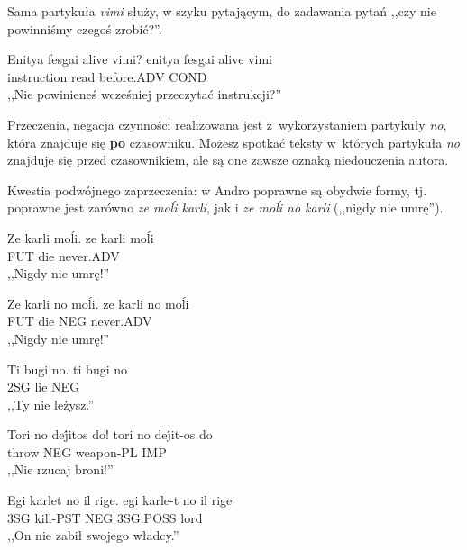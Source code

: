 \begin{spacing}{1.1}
Sama partykuła \emph{vimi} służy, w szyku pytającym, do zadawania pytań ,,czy
nie powinniśmy czegoś zrobić?''.

\begin{exe}
	\ex
	\trans Enitya fesgai alive vimi?
	\gll enitya fesgai alive vimi\\
	  instruction read before.ADV COND\\
	\glt  ,,Nie powinieneś wcześniej przeczytać instrukcji?''
\end{exe}

Przeczenia, negacja czynności realizowana jest z~wykorzystaniem partykuły
\emph{no}, która znajduje się \textbf{po} czasowniku. Możesz spotkać teksty
w~których partykuła \emph{no} znajduje się przed czasownikiem, ale są one zawsze
oznaką niedouczenia autora.

Kwestia podwójnego zaprzeczenia: w Andro poprawne są obydwie formy, tj. poprawne
jest zarówno \emph{ze moĺi karli}, jak i \emph{ze moĺi no karli} (,,nigdy nie
umrę'').

\begin{exe}
	\ex
	\trans Ze karli moĺi.
	\gll ze karli moĺi\\
	  FUT die never.ADV\\
	\glt  ,,Nigdy nie umrę!''
\end{exe}

\begin{exe}
	\ex
	\trans Ze karli no moĺi.
	\gll ze karli no moĺi\\
	  FUT die NEG never.ADV\\
	\glt  ,,Nigdy nie umrę!''
\end{exe}


\begin{exe}
	\ex
	\trans Ti bugi no.
	\gll ti bugi no\\
	  2SG lie NEG\\
	\glt  ,,Ty nie leżysz.''
\end{exe}

\begin{exe}
	\ex
	\trans Tori no dej́itos do!
	\gll tori no dej́it-os do\\
	  throw NEG weapon-PL IMP\\
	\glt  ,,Nie rzucaj broni!''
\end{exe}

\begin{exe}
	\ex
	\trans Egi karlet no il rige.
	\gll egi karle-t no il rige\\
	  3SG kill-PST NEG 3SG.POSS lord\\
	\glt  ,,On nie zabił swojego władcy.''
\end{exe}


\end{spacing}
